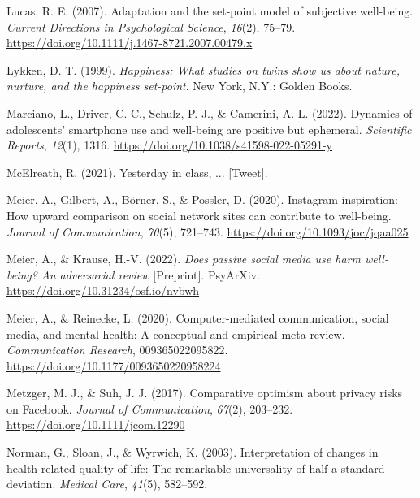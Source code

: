 \documentclass[
  man,mask]{apa6}
\newlength{\cslhangindent}
\newlength{\cslentryspacingunit} %
\newenvironment{CSLReferences}[2] %
 {%
  \setlength{\parindent}{0pt}
  \ifodd #1
  \let\oldpar\par
  \def\par{\hangindent=\cslhangindent\oldpar}
  \fi
  \setlength{\parskip}{#2\cslentryspacingunit}
 }%
 {}
\begin{document}
\begin{CSLReferences}{1}{0}
\leavevmode{}%
Lucas, R. E. (2007). Adaptation and the set-point model of subjective well-being. \emph{Current Directions in Psychological Science}, \emph{16}(2), 75--79. \url{https://doi.org/10.1111/j.1467-8721.2007.00479.x}

\leavevmode{}%
Lykken, D. T. (1999). \emph{Happiness: {What} studies on twins show us about nature, nurture, and the happiness set-point}. {New York, N.Y.}: {Golden Books}.

\leavevmode{}%
Marciano, L., Driver, C. C., Schulz, P. J., \& Camerini, A.-L. (2022). Dynamics of adolescents' smartphone use and well-being are positive but ephemeral. \emph{Scientific Reports}, \emph{12}(1), 1316. \url{https://doi.org/10.1038/s41598-022-05291-y}

\leavevmode{}%
McElreath, R. (2021). Yesterday in class, ... {[}Tweet{]}.

\leavevmode{}%
Meier, A., Gilbert, A., Börner, S., \& Possler, D. (2020). Instagram inspiration: {How} upward comparison on social network sites can contribute to well-being. \emph{Journal of Communication}, \emph{70}(5), 721--743. \url{https://doi.org/10.1093/joc/jqaa025}

\leavevmode{}%
Meier, A., \& Krause, H.-V. (2022). \emph{Does passive social media use harm well-being? {An} adversarial review} {[}Preprint{]}. {PsyArXiv}. \url{https://doi.org/10.31234/osf.io/nvbwh}

\leavevmode{}%
Meier, A., \& Reinecke, L. (2020). Computer-mediated communication, social media, and mental health: {A} conceptual and empirical meta-review. \emph{Communication Research}, 009365022095822. \url{https://doi.org/10.1177/0093650220958224}

\leavevmode{}%
Metzger, M. J., \& Suh, J. J. (2017). Comparative optimism about privacy risks on {Facebook}. \emph{Journal of Communication}, \emph{67}(2), 203--232. \url{https://doi.org/10.1111/jcom.12290}

\leavevmode{}%
Norman, G., Sloan, J., \& Wyrwich, K. (2003). Interpretation of changes in health-related quality of life: {The} remarkable universality of half a standard deviation. \emph{Medical Care}, \emph{41}(5), 582--592.


\end{CSLReferences}
\end{document}
